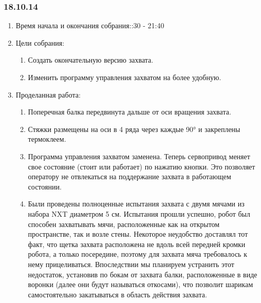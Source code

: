 
\subsubsection{18.10.14}

\begin{enumerate}
	\item Время начала и окончания собрания::30 - 21:40
	\item Цели собрания:\newline
	\begin{enumerate}
	  \item Создать окончательную версию захвата.\newline
	  
	  \item Изменить программу управления захватом на более удобную.\newline
	  
    \end{enumerate}
    
	\item Проделанная работа:\newline
	\begin{enumerate}
	  \item Поперечная балка передвинута дальше от оси вращения захвата.\newline
      
      \item Стяжки размещены на оси в 4 ряда через каждые 90° и закреплены термоклеем.\newline
      
      \item Программа управления захватом заменена. Теперь сервопривод меняет свое состояние (стоит или работает) по нажатию кнопки. Это позволяет оператору не отвлекаться на поддержание захвата в работающем состоянии.\newline
      
      \item Были проведены полноценные испытания захвата с двумя мячами из набора NXT диаметром 5 см. Испытания прошли успешно, робот был способен захватывать мячи, расположенные как на открытом пространстве, так и возле стены. Некоторое неудобство доставлял тот факт, что щетка захвата расположена не вдоль всей передней кромки робота, а только посередине, поэтому для захвата мяча требовалось к нему прицеливаться. Впоследствии мы планируем устранить этот недостаток, установив по бокам от захвата балки, расположенные в виде воронки (далее они будут называться откосами), что позволит шарикам самостоятельно закатываться в область действия захвата.\newline
      

\end{enumerate}
\end{enumerate}
